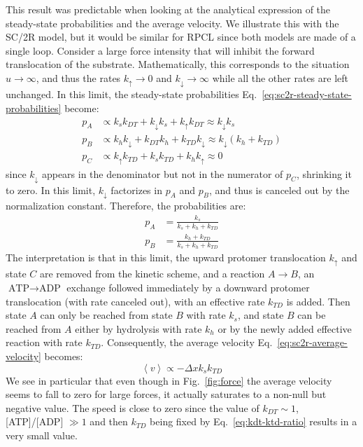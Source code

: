     This result was predictable when looking at the analytical expression of the steady-state probabilities and the average velocity. We illustrate this with the SC/2R model, but it would be similar for RPCL since both models are made of a single loop. Consider a large force intensity that will inhibit the forward translocation of the substrate. Mathematically, this corresponds to the situation $u \rightarrow \infty$, and thus the rates $k_\uparrow \rightarrow 0$ and $k_\downarrow \rightarrow\infty$ while all the other rates are left unchanged. In this limit, the steady-state probabilities Eq.~\eqref{eq:sc2r-steady-state-probabilities} become:
    \begin{equation}
    \begin{split}
        p_A &\propto k_s k_{DT} + k_\downarrow k_s + k_\uparrow k_{DT} 
            \approx k_\downarrow k_s \\
        p_B &\propto k_h k_\downarrow + k_{DT} k_h + k_{TD} k_\downarrow 
            \approx k_\downarrow (k_h + k_{TD}) \\
        p_C &\propto k_\uparrow k_{TD} + k_s k_{TD} + k_h k_\uparrow
            \approx 0
    \end{split}
    \end{equation}
    since $k_\downarrow$ appears in the denominator but not in the numerator of $p_C$, shrinking it to zero. In this limit, $k_\downarrow$ factorizes in $p_A$ and $p_B$, and thus is canceled out by the normalization constant. Therefore, the probabilities are:
    \begin{equation}
    \begin{split}
        p_A &= \frac{k_s}{k_s + k_h + k_{TD}} \\
        p_B &= \frac{k_h + k_{TD}}{k_s + k_h + k_{TD}}
    \end{split}
    \end{equation}
    The interpretation is that in this limit, the upward protomer translocation $k_\uparrow$ and state $C$ are removed from the kinetic scheme, and a reaction $A\to B$, an $\text{ATP}\to\text{ADP}$ exchange followed immediately by a downward protomer translocation (with rate canceled out), with an effective rate $k_{TD}$ is added. Then state $A$ can only be reached from state $B$ with rate $k_s$, and state $B$ can be reached from $A$ either by hydrolysis with rate $k_h$ or by the newly added effective reaction with rate $k_{TD}$. Consequently, the average velocity Eq.~\eqref{eq:sc2r-average-velocity} becomes:
    \begin{equation}
        \left\langle v \right\rangle \propto - \Delta x k_s k_{TD}
    \end{equation}
    We see in particular that even though in Fig.~\ref{fig:force} the average velocity seems to fall to zero for large forces, it actually saturates to a non-null but negative value. The speed is close to zero since the value of $k_{DT} \sim 1$, [ATP]/[ADP] $\gg 1$ and then $k_{TD}$ being fixed by Eq.~\eqref{eq:kdt-ktd-ratio} results in a very small value.
    

